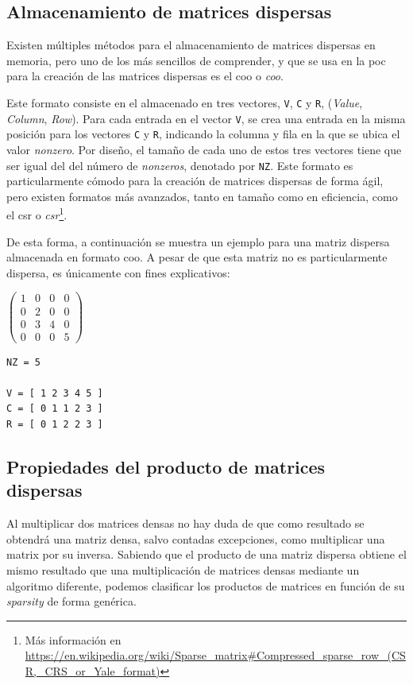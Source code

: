 \subsection{Almacenamiento de matrices dispersas}
\label{ssec:almacenamiento_matrices_dispersas}
Existen múltiples métodos para el almacenamiento de matrices dispersas en memoria, pero uno de los más sencillos de comprender, y que se usa en la \acrshort{poc} para la creación de las matrices dispersas es el \acrshort{coo} o \textit{\acrlong{coo}}.

Este formato consiste en el almacenado en tres vectores, \texttt{V}, \texttt{C} y \texttt{R}, (\textit{Value}, \textit{Column}, \textit{Row}). Para cada entrada en el vector \texttt{V}, se crea una entrada en la misma posición para los vectores \texttt{C} y \texttt{R}, indicando la columna y fila en la que se ubica el valor \textit{nonzero}. Por diseño, el tamaño de cada uno de estos tres vectores tiene que ser igual del del número de \textit{nonzeros}, denotado por \texttt{NZ}. Este formato es particularmente cómodo para la creación de matrices dispersas de forma ágil, pero existen formatos más avanzados, tanto en tamaño como en eficiencia, como el \acrshort{csr} o \textit{\acrlong{csr}}\footnote{Más información en \url{https://en.wikipedia.org/wiki/Sparse_matrix\#Compressed_sparse_row_(CSR,\_CRS\_or\_Yale\_format)}}.

De esta forma, a continuación se muestra un ejemplo para una matriz dispersa almacenada en formato \acrshort{coo}. A pesar de que esta matriz no es particularmente dispersa, es únicamente con fines explicativos:

\begin{center}
    $\begin{pmatrix}
        1 & 0 & 0 & 0\\
        0 & 2 & 0 & 0\\
        0 & 3 & 4 & 0\\
        0 & 0 & 0 & 5
    \end{pmatrix}$
    \vspace*{0.5cm}
\begin{lstlisting}[]
NZ = 5

V = [ 1 2 3 4 5 ]
C = [ 0 1 1 2 3 ]
R = [ 0 1 2 2 3 ]
\end{lstlisting}
\end{center}

\subsection{Propiedades del producto de matrices dispersas}
\label{ssec:propiedades_producto_matrices_dispersas}
Al multiplicar dos matrices densas no hay duda de que como resultado se obtendrá una matriz densa, salvo contadas excepciones, como multiplicar una matrix por su inversa. Sabiendo que el producto de una matriz dispersa obtiene el mismo resultado que una multiplicación de matrices densas mediante un algoritmo diferente, podemos clasificar los productos de matrices en función de su \textit{sparsity} de forma genérica.


